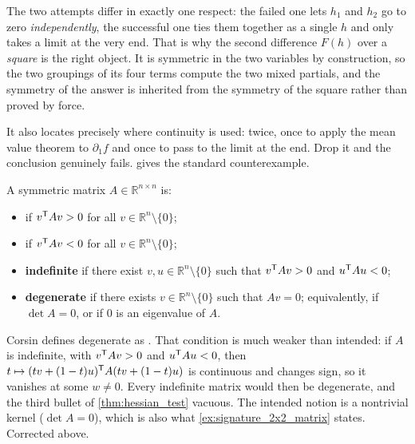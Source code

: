 \begin{remark}
\label{rem:why_schwarz_needs_care}
The two attempts differ in exactly one respect: the failed one lets $h_1$ and $h_2$ go to zero
\emph{independently}, the successful one ties them together as a single $h$ and only takes a
limit at the very end. That is why the second difference $F(h)$ over a \emph{square} is the
right object. It is symmetric in the two variables by construction, so the two groupings of its
four terms compute the two mixed partials, and the symmetry of the answer is inherited from the
symmetry of the square rather than proved by force.

It also locates precisely where continuity is used: twice, once to apply the mean value theorem
to $\partial_1f$ and once to pass to the limit at the end. Drop it and the conclusion genuinely
fails.  gives the standard counterexample.
\end{remark}

\begin{definition}
\label{def:sign_symmetric_matrix}
A symmetric matrix $A \in \mathbb{R}^{n\times n}$ is:
\begin{itemize}
  \item {}  if $v^{\mathsf{T}} Av > 0$ for all
    $v \in \mathbb{R}^n\setminus\{0\}$;
  \item {}  if $v^{\mathsf{T}} Av < 0$ for all
    $v \in \mathbb{R}^n\setminus\{0\}$;
  \item \textbf{indefinite} if there exist $v, u \in \mathbb{R}^n\setminus\{0\}$ such that
    $v^{\mathsf{T}} Av > 0$ and $u^{\mathsf{T}} Au < 0$;
  \item \textbf{degenerate}  if there exists
    $v \in \mathbb{R}^n\setminus\{0\}$ such that $Av = 0$; equivalently, if $\det A = 0$, or
    if $0$ is an eigenvalue of $A$.
\end{itemize}
\end{definition}

\begin{ainote}
Corsin defines degenerate as . That
condition is much weaker than intended: if $A$ is indefinite, with $v^{\mathsf{T}} Av > 0$ and
$u^{\mathsf{T}} Au < 0$, then $t \mapsto (tv+(1-t)u)^{\mathsf{T}} A(tv+(1-t)u)$ is continuous and changes
sign, so it vanishes at some $w \neq 0$. Every indefinite matrix would then be degenerate, and
the third bullet of \cref{thm:hessian_test} vacuous. The intended notion is a nontrivial kernel
($\det A = 0$), which is also what \cref{ex:signature_2x2_matrix} states. Corrected above.
\end{ainote}

